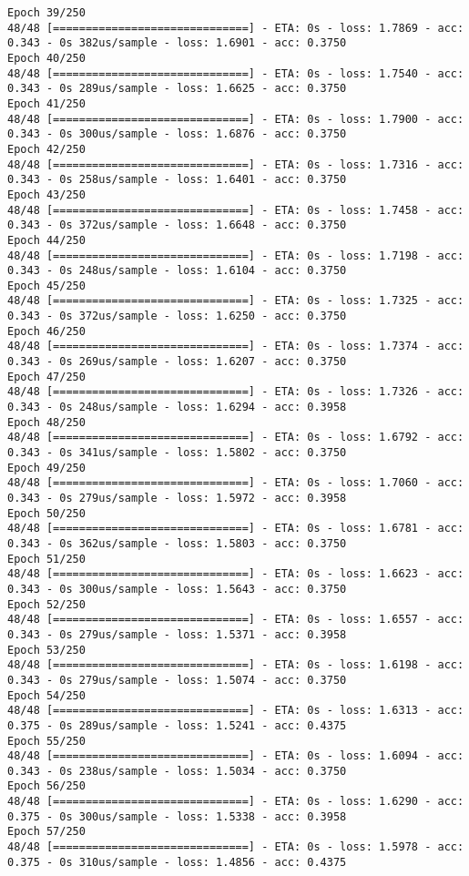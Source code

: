 \documentclass[11pt]{article}
\begin{document}
\begin{Verbatim}[commandchars=\\\{\}]
Epoch 39/250
48/48 [==============================] - ETA: 0s - loss: 1.7869 - acc: 0.343 - 0s 382us/sample - loss: 1.6901 - acc: 0.3750
Epoch 40/250
48/48 [==============================] - ETA: 0s - loss: 1.7540 - acc: 0.343 - 0s 289us/sample - loss: 1.6625 - acc: 0.3750
Epoch 41/250
48/48 [==============================] - ETA: 0s - loss: 1.7900 - acc: 0.343 - 0s 300us/sample - loss: 1.6876 - acc: 0.3750
Epoch 42/250
48/48 [==============================] - ETA: 0s - loss: 1.7316 - acc: 0.343 - 0s 258us/sample - loss: 1.6401 - acc: 0.3750
Epoch 43/250
48/48 [==============================] - ETA: 0s - loss: 1.7458 - acc: 0.343 - 0s 372us/sample - loss: 1.6648 - acc: 0.3750
Epoch 44/250
48/48 [==============================] - ETA: 0s - loss: 1.7198 - acc: 0.343 - 0s 248us/sample - loss: 1.6104 - acc: 0.3750
Epoch 45/250
48/48 [==============================] - ETA: 0s - loss: 1.7325 - acc: 0.343 - 0s 372us/sample - loss: 1.6250 - acc: 0.3750
Epoch 46/250
48/48 [==============================] - ETA: 0s - loss: 1.7374 - acc: 0.343 - 0s 269us/sample - loss: 1.6207 - acc: 0.3750
Epoch 47/250
48/48 [==============================] - ETA: 0s - loss: 1.7326 - acc: 0.343 - 0s 248us/sample - loss: 1.6294 - acc: 0.3958
Epoch 48/250
48/48 [==============================] - ETA: 0s - loss: 1.6792 - acc: 0.343 - 0s 341us/sample - loss: 1.5802 - acc: 0.3750
Epoch 49/250
48/48 [==============================] - ETA: 0s - loss: 1.7060 - acc: 0.343 - 0s 279us/sample - loss: 1.5972 - acc: 0.3958
Epoch 50/250
48/48 [==============================] - ETA: 0s - loss: 1.6781 - acc: 0.343 - 0s 362us/sample - loss: 1.5803 - acc: 0.3750
Epoch 51/250
48/48 [==============================] - ETA: 0s - loss: 1.6623 - acc: 0.343 - 0s 300us/sample - loss: 1.5643 - acc: 0.3750
Epoch 52/250
48/48 [==============================] - ETA: 0s - loss: 1.6557 - acc: 0.343 - 0s 279us/sample - loss: 1.5371 - acc: 0.3958
Epoch 53/250
48/48 [==============================] - ETA: 0s - loss: 1.6198 - acc: 0.343 - 0s 279us/sample - loss: 1.5074 - acc: 0.3750
Epoch 54/250
48/48 [==============================] - ETA: 0s - loss: 1.6313 - acc: 0.375 - 0s 289us/sample - loss: 1.5241 - acc: 0.4375
Epoch 55/250
48/48 [==============================] - ETA: 0s - loss: 1.6094 - acc: 0.343 - 0s 238us/sample - loss: 1.5034 - acc: 0.3750
Epoch 56/250
48/48 [==============================] - ETA: 0s - loss: 1.6290 - acc: 0.375 - 0s 300us/sample - loss: 1.5338 - acc: 0.3958
Epoch 57/250
48/48 [==============================] - ETA: 0s - loss: 1.5978 - acc: 0.375 - 0s 310us/sample - loss: 1.4856 - acc: 0.4375

\end{Verbatim}
\end{document}
